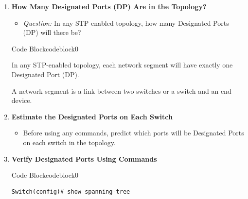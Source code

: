 \documentclass[a4paper]{book}
\begin{document}
\begin{enumerate}
\begin{ocg}{Code Block}{codeblock}{0}
\begin{tcolorbox}
{Total Root Ports = 5
        }
        \end{tcolorbox}
        \end{ocg}
        

    \item \textbf{How Many Designated Ports (DP) Are in the Topology?}
    \begin{itemize}
        \item \textit{Question:} In any STP-enabled topology, how many Designated Ports (DP) will there be?
    \end{itemize}


            
            \begin{ocg}{Code Block}{codeblock}{0}
            \vspace{0.5cm}
            \begin{tcolorbox}
            \small{
                In any STP-enabled topology, each network segment will have exactly one Designated Port (DP).

                A network segment is a link between two switches or a switch and an end device.
            }
            \end{tcolorbox}
            \end{ocg}
            

    \item \textbf{Estimate the Designated Ports on Each Switch}
    \begin{itemize}
        \item Before using any commands, predict which ports will be Designated Ports on each switch in the topology. 
    \end{itemize}

    \item \textbf{Verify Designated Ports Using Commands}


\begin{ocg}{Code Block}{codeblock}{0}
\vspace{0.5cm}
\begin{lstlisting}
Switch(config)# show spanning-tree
\end{lstlisting}


\end{ocg}
\end{enumerate}
\end{document}
